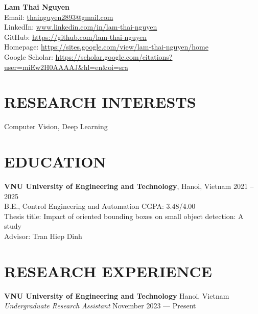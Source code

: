 \documentclass[a4paper,9pt]{extarticle}
\begin{document}
\pagestyle{fancy}
\renewcommand{\headrulewidth}{0pt}
\fancyhead{}
\fancyhead[R]{\textit{\today}}
\thispagestyle{empty} %

\begin{flushleft}
\textbf{\LARGE Lam Thai Nguyen}\\[2pt] %
Email: \href{mailto:thainguyen2893@gmail.com}{thainguyen2893@gmail.com} \\
LinkedIn: \href{https://www.linkedin.com/in/lam-thai-nguyen}{www.linkedin.com/in/lam-thai-nguyen} \\
GitHub: \href{https://github.com/lam-thai-nguyen}{https://github.com/lam-thai-nguyen}\\
Homepage: \href{https://sites.google.com/view/lam-thai-nguyen/home}{https://sites.google.com/view/lam-thai-nguyen/home} \\
Google Scholar: \href{https://scholar.google.com/citations?user=miEw2H0AAAAJ&hl=en&oi=sra}{https://scholar.google.com/citations?user=miEw2H0AAAAJ\&hl=en\&oi=sra} \\
\end{flushleft}

\section*{RESEARCH INTERESTS}
\noindent
Computer Vision, Deep Learning

\section*{EDUCATION}
\noindent
\textbf{VNU University of Engineering and Technology}, Hanoi, Vietnam \hfill 2021 -- 2025\\
B.E., Control Engineering and Automation \hfill CGPA: 3.48/4.00 \\
Thesis title: Impact of oriented bounding boxes on small object detection: A study \\
Advisor: Tran Hiep Dinh

\section*{RESEARCH EXPERIENCE}
\noindent
\textbf{VNU University of Engineering and Technology} \hfill Hanoi, Vietnam  \\ %
\textit{Undergraduate Research Assistant} \hfill November 2023 --- Present
\end{document}
